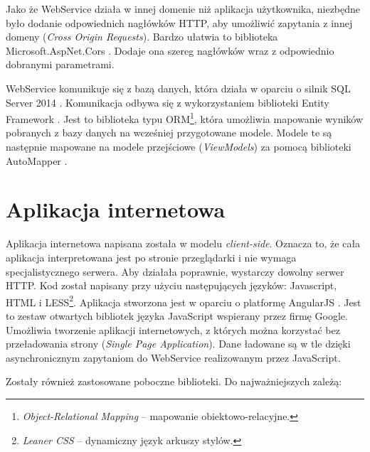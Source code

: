 \documentclass[a4paper]{book}
\begin{document}
		Jako że WebService działa w innej domenie niż aplikacja użytkownika, niezbędne było dodanie odpowiednich nagłówków HTTP, aby umożliwić zapytania z innej domeny (\emph{Cross Origin Requests}). Bardzo ułatwia to biblioteka Microsoft.AspNet.Cors \cite{id:ASPCors}. Dodaje ona szereg nagłówków wraz z odpowiednio dobranymi parametrami.
		
		WebService komunikuje się z bazą danych, która działa w oparciu o silnik SQL Server 2014 \cite{id:SQLServer}. Komunikacja odbywa się z wykorzystaniem biblioteki Entity Framework \cite{id:EntityFramework}. Jest to biblioteka typu ORM\footnote{\emph{Object-Relational Mapping} -- mapowanie obiektowo-relacyjne. },
		która umożliwia mapowanie wyników pobranych z bazy danych na wcześniej przygotowane modele. Modele te są następnie mapowane na modele przejściowe (\emph{ViewModels}) za pomocą biblioteki AutoMapper \cite{id:Automapper}.
		
		\section{Aplikacja internetowa} 
		\label{id:sec:web}
		Aplikacja internetowa napisana została w modelu \emph{client-side}. Oznacza to, że cała aplikacja interpretowana jest po stronie przeglądarki i nie wymaga specjalistycznego serwera. Aby działała poprawnie, wystarczy dowolny serwer HTTP. Kod został napisany przy użyciu następujących języków: Javascript, HTML i LESS\footnote{\emph{Leaner CSS} -- dynamiczny język arkuszy stylów.}. 
		Aplikacja stworzona jest w oparciu o platformę AngularJS \cite{keylist}. Jest to zestaw otwartych bibliotek języka JavaScript wspierany przez firmę Google. Umożliwia tworzenie aplikacji internetowych, z których można korzystać bez przeładowania strony (\emph{Single Page Application}). Dane ładowane są w tle dzięki asynchronicznym zapytaniom do WebService realizowanym przez JavaScript.
		
		Zostały również zastosowane poboczne biblioteki. Do najważniejszych zależą:
		
\end{document}
